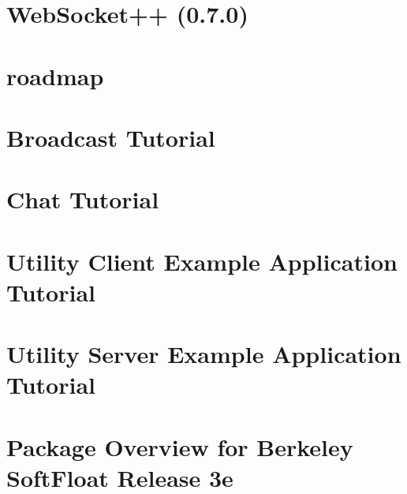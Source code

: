 \documentclass[twoside]{book}
\newcommand{\+}{\discretionary{\mbox{\scriptsize$\hookleftarrow$}}{}{}}
\begin{document}
\chapter{Web\+Socket++ (0.7.0)}
\label{md_libraries_fc_vendor_websocketpp_readme}

\chapter{roadmap}
\label{md_libraries_fc_vendor_websocketpp_roadmap}

\chapter{Broadcast Tutorial}
\label{md_libraries_fc_vendor_websocketpp_tutorials_broadcast_tutorial_broadcast_tutorial}

\chapter{Chat Tutorial}
\label{md_libraries_fc_vendor_websocketpp_tutorials_chat_tutorial_chat_tutorial}

\chapter{Utility Client Example Application Tutorial}
\label{md_libraries_fc_vendor_websocketpp_tutorials_utility_client_utility_client}

\chapter{Utility Server Example Application Tutorial}
\label{md_libraries_fc_vendor_websocketpp_tutorials_utility_server_utility_server}

\chapter{Package Overview for Berkeley Soft\+Float Release 3e}
\label{md_libraries_softfloat__r_e_a_d_m_e}

\end{document}
